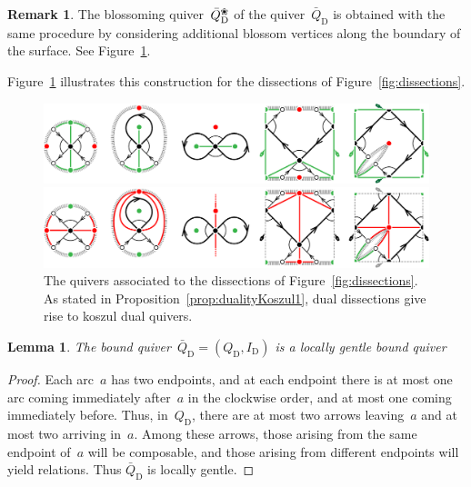\documentclass{amsart}
\newtheorem{lemma}[theorem]{Lemma}
\theoremstyle{definition}
\newtheorem{remark}[theorem]{Remark}
\newcommand{\fref}[1]{Figure~\ref{#1}} %
\newcommand{\blossom}{^\text{\ding{96}}} %
\newcommand{\dissection}{\mathrm{D}} %
\begin{document}
\begin{remark}
The blossoming quiver~$\bar Q_\dissection\blossom$ of the quiver~$\bar Q_\dissection$ is obtained with the same procedure by considering additional blossom vertices along the boundary of the surface. See \fref{fig:quiversDissections}.
\end{remark}

\fref{fig:quiversDissections} illustrates this construction for the dissections of \fref{fig:dissections}.

\begin{figure}[t]
	\capstart
	\centerline{\includegraphics[scale=.7]{quiversDissections1}}
	\medskip
	\centerline{\includegraphics[scale=.7]{quiversDissections2}}
	\caption{The quivers associated to the dissections of \fref{fig:dissections}. As stated in Proposition~\ref{prop:dualityKoszul1}, dual dissections give rise to koszul dual quivers.}
	\label{fig:quiversDissections}
\end{figure}

\begin{lemma}
\label{lemm:quiverOfDissectionIsLocallyGentle}
The bound quiver~$\bar Q_{\dissection} = (Q_{\dissection}, I_{\dissection})$ is a locally gentle bound quiver
\end{lemma}
\begin{proof}
Each arc~$a$ has two endpoints, and at each endpoint there is at most one arc coming immediately after~$a$ in the clockwise order, and at most one coming immediately before.
Thus, in~$Q_{\dissection}$, there are at most two arrows leaving~$a$ and at most two arriving in~$a$.
Among these arrows, those arising from the same endpoint of~$a$ will be composable, and those arising from different endpoints will yield relations.
Thus $\bar Q_{\dissection}$ is locally gentle.
\end{proof}
\end{document}
